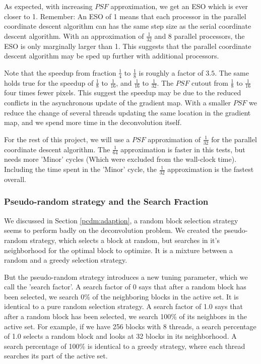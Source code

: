 As expected, with increasing $PSF$ approximation, we get an ESO which is ever closer to 1. Remember: An ESO of 1 means that each processor in the parallel coordinate descent algorithm can has the same step size as the serial coordinate descent algorithm. With an approximation of $\frac{1}{32}$ and 8 parallel processors, the ESO is only marginally larger than 1. This suggests that the parallel coordinate descent algorithm may be sped up further with additional processors.

Note that the speedup from fraction $\frac{1}{4}$ to $\frac{1}{8}$ is roughly a factor of $3.5$. The same holds true for the speedup of $\frac{1}{8}$ to $\frac{1}{16}$, and $\frac{1}{16}$ to $\frac{1}{32}$. The $PSF$ cutout from  $\frac{1}{8}$ to  $\frac{1}{16}$ four times fewer pixels. This suggest the speedup may be due to the reduced conflicts in the asynchronous update of the gradient map. With a smaller $PSF$ we reduce the change of several threads updating the same location in the gradient map, and we spend more time in the deconvolution itself.

For the rest of this project, we will use a $PSF$ approximation of $\frac{1}{32}$ for the parallel coordinate descent algorithm. The $\frac{1}{64}$ approximation is faster in this tests, but needs more 'Minor' cycles (Which were excluded from the wall-clock time). Including the time spent in the 'Minor' cycle, the $\frac{1}{32}$ approximation is the fastest overall.


\subsubsection{Pseudo-random strategy and the Search Fraction}\label{pcdm:results:fraction}
We discussed in Section \ref{pcdm:adaption}, a random block selection strategy seems to perform badly on the deconvolution problem. We created the pseudo-random strategy, which selects a block at random, but searches in it's neighborhood for the optimal block to optimize. It is a mixture between a random and a greedy selection strategy.

But the pseudo-random strategy introduces a new tuning parameter, which we call the 'search factor'. A search factor of 0 says that after a random block has been selected, we search 0\% of the neighboring blocks in the active set. It is identical to a pure random selection strategy. A search factor of 1.0 says that after a random block has been selected, we search 100\% of its neighbors in the active set. For example, if we have 256 blocks with 8 threads, a search percentage of 1.0 selects a random block and looks at 32 blocks in its neighborhood. A search percentage of 100\% is identical to a greedy strategy, where each thread searches its part of the active set.

